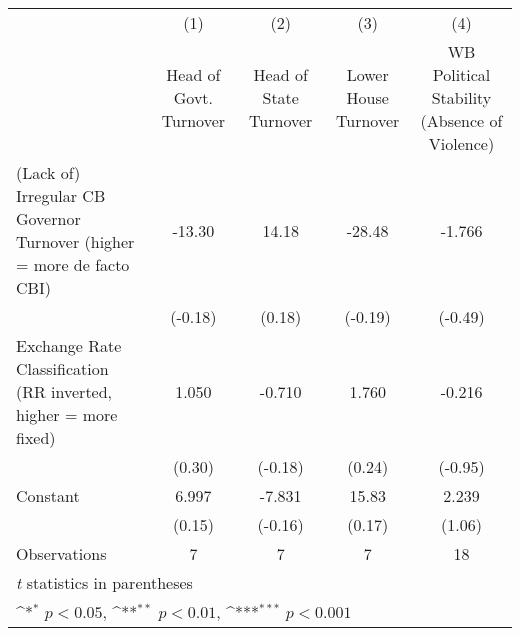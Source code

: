 {
\def\sym#1{\ifmmode^{#1}\else\(^{#1}\)\fi}
\begin{tabular*}{\linewidth}{@{\hskip\tabcolsep\extracolsep\fill}l*{4}{c}}
\hline\hline
                &\multicolumn{1}{c}{(1)}&\multicolumn{1}{c}{(2)}&\multicolumn{1}{c}{(3)}&\multicolumn{1}{c}{(4)}\\
                &\multicolumn{1}{c}{Head of Govt. Turnover}&\multicolumn{1}{c}{Head of State Turnover}&\multicolumn{1}{c}{Lower House Turnover}&\multicolumn{1}{c}{WB Political Stability (Absence of Violence)}\\
\hline
(Lack of) Irregular CB Governor Turnover (higher = more de facto CBI)&   -13.30         &    14.18         &   -28.48         &   -1.766         \\
                &  (-0.18)         &   (0.18)         &  (-0.19)         &  (-0.49)         \\
[1em]
Exchange Rate Classification (RR inverted, higher = more fixed)&    1.050         &   -0.710         &    1.760         &   -0.216         \\
                &   (0.30)         &  (-0.18)         &   (0.24)         &  (-0.95)         \\
[1em]
Constant        &    6.997         &   -7.831         &    15.83         &    2.239         \\
                &   (0.15)         &  (-0.16)         &   (0.17)         &   (1.06)         \\
\hline
Observations    &        7         &        7         &        7         &       18         \\
\hline\hline
\multicolumn{5}{l}{\footnotesize \textit{t} statistics in parentheses}\\
\multicolumn{5}{l}{\footnotesize \sym{*} \(p<0.05\), \sym{**} \(p<0.01\), \sym{***} \(p<0.001\)}\\
\end{tabular*}
}
